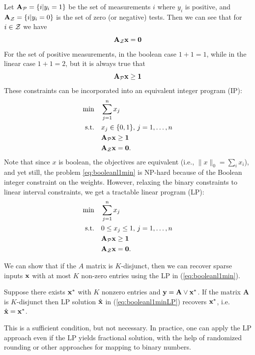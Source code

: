 Let $\mathbf{A}_{\mathcal{P}}= \{i | y_i = 1\}$ be the set of measurements $i$ where $y_i$ is positive, 
and $\mathbf{A}_{\mathcal{Z}} = \{i | y_i = 0\}$ is the set of zero (or negative) tests. Then we can 
see that for $i \in \mathcal{Z}$ we have
\begin{equation}
\mathbf{A}_{\mathcal{Z}}\mathbf{x} = \mathbf{0}
\end{equation}
For the set of positive measurements, in the boolean case $1+1 = 1$, while
in the linear case $1 + 1 = 2$, but it is always true that 
\begin{equation}
\mathbf{A}_{\mathcal{P}}\mathbf{x} \ge \mathbf{1}
\end{equation}
These constraints can be incorporated into an equivalent integer program (IP):
\begin{align}
\label{eq:booleanl1min}
	\min\quad &\sum_{j=1}^{n} x_j \\
	\textrm{s.t.\quad} & x_j \in \{0,1\},\,j = 1,\ldots,n\nonumber\\
		& \mathbf{A}_{\mathcal{P}}\mathbf{x} \ge \mathbf{1}\nonumber\\
		& \mathbf{A}_{\mathcal{Z}}\mathbf{x} = \mathbf{0}.\nonumber
\end{align}
Note that since $x$ is boolean, the objectives are equivalent (i.e., $\|x\|_0=\sum_i{x_i}$), and yet still, the problem
\eqref{eq:booleanl1min} is NP-hard because of the Boolean integer constraint on the weights. However, relaxing the binary constraints to linear interval constraints, we get a tractable linear program (LP):
\begin{align}
\label{eq:booleanl1min}
	\min\quad &\sum_{j=1}^{n} x_j \\
	\textrm{s.t.\quad} & 0\leq x_j \leq 1, \,j = 1,\ldots,n\nonumber\\
		& \mathbf{A}_{\mathcal{P}}\mathbf{x} \ge \mathbf{1}\nonumber\\
		& \mathbf{A}_{\mathcal{Z}}\mathbf{x} = \mathbf{0}.\nonumber
\end{align}

We can show that if the $A$ matrix is $K$-disjunct, then we can recover 
sparse inputs $\mathbf{x}$ with at most $K$ non-zero entries using the LP 
in (\ref{eq:booleanl1min}). 
\begin{theorem}
\label{thm:LP_recovery}
Suppose there exists $\mathbf{x}^*$ with $K$ nonzero entries and 
$\mathbf{y} = \mathbf{A} \lor \mathbf{x}^*$. If the matrix $\mathbf{A}$ is $K$-disjunct then 
LP solution $\hat{\mathbf{x}}$ in (\ref{eq:booleanl1minLP}) recovers $\mathbf{x}^*$, i.e. $\hat{\mathbf{x}} = \mathbf{x}^*$.
\end{theorem}

This is a sufficient condition, but not necessary. In practice, one can apply
the LP approach even if the LP yields fractional solution, with the help 
of randomized rounding or other approaches for mapping to binary numbers.

